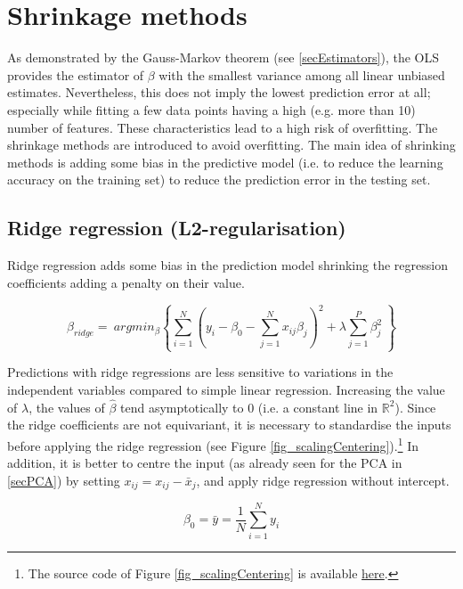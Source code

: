 \section{Shrinkage methods}
As demonstrated by the Gauss-Markov theorem (see \ref{secEstimators}), the OLS provides the estimator of $\beta$ with the smallest variance among all linear unbiased estimates. Nevertheless, this does not imply the lowest prediction error at all; especially while fitting a few data points having a high (e.g. more than 10) number of features. These characteristics lead to a high risk of overfitting. The shrinkage methods are introduced to avoid overfitting. The main idea of shrinking methods is adding some bias in the predictive model (i.e. to reduce the learning accuracy on the training set) to reduce the prediction error in the testing set.

\subsection{Ridge regression (L2-regularisation)}
Ridge regression adds some bias in the prediction model shrinking the regression coefficients adding a penalty on their value.

\begin{equation}
{\hat{\beta}}_{ridge}=\ argmin_\beta{\left\{\sum_{i=1}^{N}\left(y_i-\beta_0-\sum_{j=1}^{N}{x_{ij}\beta_j}\right)^2+\lambda\sum_{j=1}^{P}\beta_j^2\ \right\}}
\label{eq_ridgeRegression}
\end{equation}

Predictions with ridge regressions are less sensitive to variations in the independent variables compared to simple linear regression. Increasing the value of $\lambda$, the values of $\hat{\beta}$ tend asymptotically to 0 (i.e. a constant line in $\mathbb{R}^2$). Since the ridge coefficients are not equivariant, it is necessary to standardise the inputs before applying the ridge regression (see Figure \ref{fig_scalingCentering}).\footnote{The source code of Figure \ref{fig_scalingCentering} is available \href{https://github.com/aletuf93/logproj/blob/master/examples/07.\%20Linear\%20Regression.ipynb}{here}.
} In addition, it is better to centre the input (as already seen for the PCA in \ref{secPCA}) by setting $x_{ij}=x_{ij}-{\bar{x}}_j$, and apply ridge regression without intercept.

\begin{equation}
\beta_0=\bar{y}=\frac{1}{N}\sum_{i=1}^{N}y_i
\label{eq_centering}
\end{equation}

